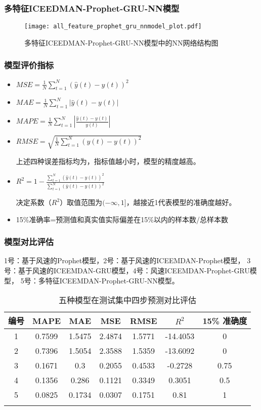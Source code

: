 \documentclass[14pt, AutoFakeBold]{ppt}
\begin{document}
\begin{frame}
  \frametitle{多特征ICEEDMAN-Prophet-GRU-NN模型}
  \begin{figure}[H]
    \centering
      \texttt{[image: all\_feature\_prophet\_gru\_nnmodel\_plot.pdf]}
      \caption{多特征ICEEDMAN-Prophet-GRU-NN模型中的NN网络结构图}
      \label{fig_gru_nn}
  \end{figure}
\end{frame}

\begin{frame}
  \frametitle{模型评价指标}
  \begin{itemize}
    \item $MSE=\frac{1}{N}\sum_{t=1}^{N}\left(\hat{y}\left(t\right)-y\left(t\right)\right)^2$
    \item $MAE=\frac{1}{N}\sum_{t=1}^{N}\left|\hat{y}\left(t\right)-y\left(t\right)\right|$
    \item $MAPE=\frac{1}{N}\sum_{t=1}^{N}\left|\frac{\hat{y}\left(t\right)-y\left(t\right)}{y\left(t\right)}\right|$
    \item $RMSE=\sqrt{\frac{1}{N}\sum_{t=1}^{N}\left(\hat{y}\left(t\right)-y\left(t\right)\right)^2}$
    
    上述四种误差指标均为，指标值越小时，模型的精度越高。
    \item $R^2=1-\frac{\sum_{t=1}^{N}(\hat{y}\left(t\right)-y\left(t\right))^2}{\sum_{t=1}^{N}(\bar{y}\left(t\right)-y\left(t\right))^2}$
    
    决定系数（$R^2$）取值范围为$(-\infty, 1]$，越接近1代表模型的准确度越好。
    \item 15\%准确率=预测值和真实值实际偏差在15\%以内的样本数/总样本数
  \end{itemize}
\end{frame}

\begin{frame}
  \frametitle{模型对比评估}
  1号：基于风速的Prophet模型，2号：基于风速的ICEEMDAN-Prophet模型，
  3号：基于风速的ICEEMDAN-GRU模型，4号：风速ICEEMDAN-Prophet-GRU模型，
  5号：多特征ICEEMDAN-Prophet-GRU-NN模型。
  \begin{table}[H]
    \centering
    \caption{五种模型在测试集中四步预测对比评估}
    \begin{tabular}{ccccccc}
    \toprule
    编号 & MAPE & MAE & MSE & RMSE & $R^2$ & 15\% 准确度 \\
    \midrule
    1 & 0.7599 & 1.5475 & 2.4874 & 1.5771 & -14.4053 & 0 \\
    2 & 0.7396 & 1.5054 & 2.3588 & 1.5359 & -13.6092 & 0 \\
    3 & 0.1671 & 0.3 & 0.2055 & 0.4533 & -0.2728 & 0.75 \\
    4 & 0.1356 & 0.286 & 0.1121 & 0.3349 & 0.3051 & 0.5 \\
    5 & 0.0825 & 0.1734 & 0.0307 & 0.1751 & 0.81 & 1 \\
    \bottomrule \\
    \end{tabular} \\
    \label{models-metrics}
  \end{table}
\end{frame}
\end{document}
